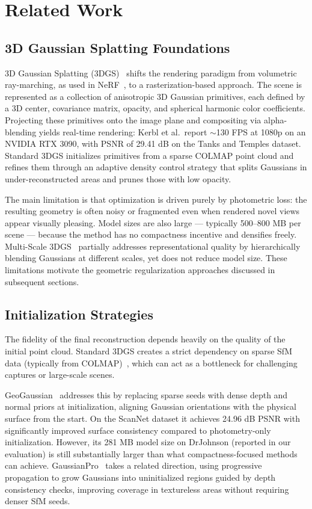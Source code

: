 \chapter{Related Work}

\section{3D Gaussian Splatting Foundations}

3D Gaussian Splatting (3DGS)~\cite{kerbl20233dgs} shifts the rendering paradigm from volumetric ray-marching, as used in NeRF~\cite{mildenhall2020nerf}, to a rasterization-based approach. The scene is represented as a collection of anisotropic 3D Gaussian primitives, each defined by a 3D center, covariance matrix, opacity, and spherical harmonic color coefficients. Projecting these primitives onto the image plane and compositing via alpha-blending yields real-time rendering: Kerbl et al.\ report $\sim$130 FPS at 1080p on an NVIDIA RTX 3090, with PSNR of 29.41 dB on the Tanks and Temples dataset. Standard 3DGS initializes primitives from a sparse COLMAP point cloud and refines them through an adaptive density control strategy that splits Gaussians in under-reconstructed areas and prunes those with low opacity.

The main limitation is that optimization is driven purely by photometric loss: the resulting geometry is often noisy or fragmented even when rendered novel views appear visually pleasing. Model sizes are also large — typically 500--800 MB per scene — because the method has no compactness incentive and densifies freely. Multi-Scale 3DGS~\cite{multiscale3dgs} partially addresses representational quality by hierarchically blending Gaussians at different scales, yet does not reduce model size. These limitations motivate the geometric regularization approaches discussed in subsequent sections.

\section{Initialization Strategies}

The fidelity of the final reconstruction depends heavily on the quality of the initial point cloud. Standard 3DGS creates a strict dependency on sparse SfM data (typically from COLMAP)~\cite{schoenberger2016sfm}, which can act as a bottleneck for challenging captures or large-scale scenes.

GeoGaussian~\cite{geogaussian} addresses this by replacing sparse seeds with dense depth and normal priors at initialization, aligning Gaussian orientations with the physical surface from the start. On the ScanNet dataset it achieves 24.96 dB PSNR with significantly improved surface consistency compared to photometry-only initialization. However, its 281 MB model size on DrJohnson (reported in our evaluation) is still substantially larger than what compactness-focused methods can achieve. GaussianPro~\cite{gaussianpro} takes a related direction, using progressive propagation to grow Gaussians into uninitialized regions guided by depth consistency checks, improving coverage in textureless areas without requiring denser SfM seeds.


